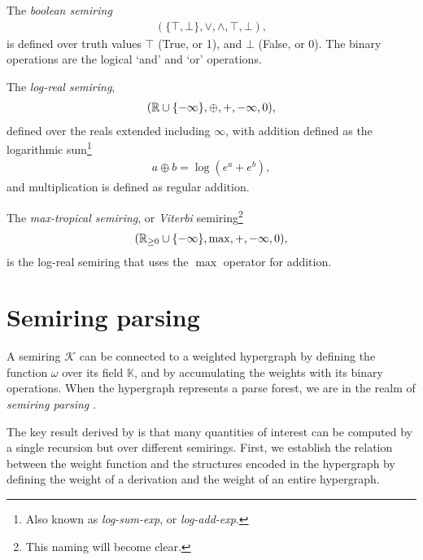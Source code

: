   \begin{example}{}
    The \textit{boolean semiring}
    \begin{align*}
      ( \{ \top, \bot \}, \vee, \wedge, \top, \bot  ),
    \end{align*}
    is defined over truth values $\top$ (True, or 1), and $\bot$ (False, or 0). The binary operations are the logical `and' and `or' operations.
  \end{example}

  \begin{example}{}
    The \textit{log-real semiring},
    \begin{align*}
      ( \mathbb{R} \cup \{ - \infty \}, \oplus, +, -\infty, 0 ),
    \end{align*}
    defined over the reals extended including $\infty$, with addition defined as the logarithmic sum\footnote{Also known as \textit{log-sum-exp}, or \textit{log-add-exp}.}
    \begin{align*}
      a \oplus b = \log( e^{a} + e^{b} ),
    \end{align*}
   and multiplication is defined as regular addition.
  \end{example}

  \begin{example}{}
    The \textit{max-tropical semiring}, or \textit{Viterbi} semiring\footnote{This naming will become clear.}
    \begin{align*}
      ( \mathbb{R}_{\geq 0} \cup \{ -\infty \}, \max, +, -\infty, 0 ),
    \end{align*}
    is the log-real semiring that uses the $\max$ operator for addition.
  \end{example}

\section{Semiring parsing}
  A semiring $\mathcal{K}$ can be connected to a weighted hypergraph by defining the function $\omega$ over its field $\mathbb{K}$, and by accumulating the weights with its binary operations. When the hypergraph represents a parse forest, we are in the realm of \textit{semiring parsing} \citep{goodman1999semiring}.

  The key result derived by \citet{goodman1999semiring} is that many quantities of interest can be computed by a single recursion but over different semirings. First, we establish the relation between the weight function and the structures encoded in the hypergraph by defining the weight of a derivation and the weight of an entire hypergraph.

